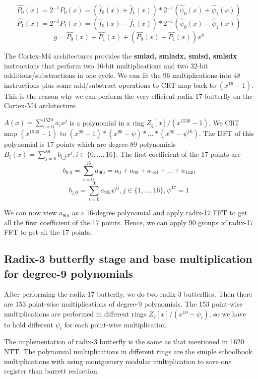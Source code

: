 \documentclass[11pt, a4paper]{article} %
\begin{document}
\[
    \hat{P_0}(x) = 2^{-1}P_0(x) = (\hat{f}_0(x) + \hat{f}_1(x)) * 2^{-1}(\hat{\psi}_0(x) + \hat{\psi}_1(x))
\]
\[
    \hat{P_1}(x) = 2^{-1}P_1(x) = (\hat{f}_0(x) - \hat{f}_1(x)) * 2^{-1}(\hat{\psi}_0(x) - \hat{\psi}_1(x))
\]
\[
    g = \hat{P_0}(x) + \hat{P_1}(x) + (\hat{P_0}(x) - \hat{P_1}(x))x^8
\]

The Cortex-M4 architectures provides the \textbf{smlad, smladx, smlsd, smlsdx} instructions that perform two 16-bit multiplications and two 32-bit additions/substractions in one cycle. We can fit the 96 multiplications into 48 instructions plus some add/substract operations to CRT map back to ${(x^{16} - 1)}$. This is the reason why we can perform the very efficient radix-17 butterfly on the Cortex-M4 architecture.

$ A(x) = \sum_{i = 0}^{1529} a_ix^j $ is a polynomial in a ring $ Z_q[x] / (x^{1530} - 1) $. We CRT map $ (x^{1530} - 1) $ to $ (x^{90} - 1)*(x^{90} - \psi)* ... * (x^{90} - \psi^{16}) $. The DFT of this polynomial is 17 points which are degree-89 polynomials $ B_i(x) = \sum_{j = 0}^{89} b_{i\_j}x^j, i \in \{0,...,16\} $. The first coefficient of the 17 points are
\[
    b_{0\_0} = \sum_{i = 0}^{16} a_{90i} = a_0 + a_{90} + a_{180} + … + a_{1440}
\]
\[
     b_{j\_0} = \sum_{i = 0}^{16} a_{90i}\psi^{ij}, j \in \{1, \ldots , 16\}, \psi^{17} = 1
\]

We can now view $ a_{90i} $ as a 16-degree polynomial and apply radix-17 FFT to get all the first coefficient of the 17 points. Hence, we can apply 90 groups of radix-17 FFT to get all the 17 points.



\subsection{Radix-3 butterfly stage and base multiplication for degree-9 polynomials} %
After performing the radix-17 butterfly, we do two radix-3 butterflies. Then there are 153 point-wise multiplications of degree-9 polynomials. The 153 point-wise multiplications are performed in different rings ${ Z_q[x] / ( x^{10} - \psi_i ) }$, so we have to hold different ${\psi_i}$ for each point-wise multiplication. 

The implementation of radix-3 butterfly is the same as that mentioned in 1620 NTT. The polynomial multiplications in different rings are the simple schoolbook multiplications with using montgomery modular multiplication to save one register than barrett reduction.
\end{document}
